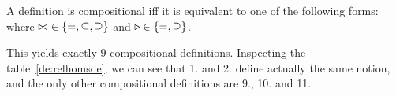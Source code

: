 \documentclass[10pt]{article}
\begin{document}

\begin{Theorem}\label{th:comp}
A definition is compositional iff it is equivalent to one of the
following forms: 
where $\bowtie\ \in\{=,\subseteq,\supseteq\}$ and
$\triangleright\in\{=,\supseteq\}$.
\end{Theorem}

\noindent
This yields exactly 9 compositional definitions. Inspecting the
table~\ref{de:relhomsde}, we can see that 1. and 2. define actually the same
notion, and the only other compositional definitions are 9., 10. and 11.
\end{document}
